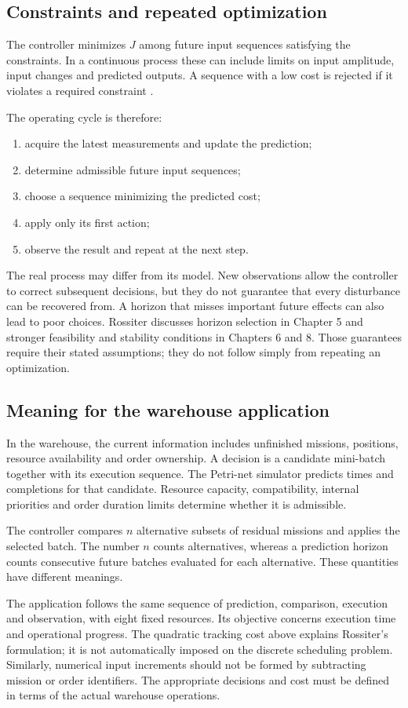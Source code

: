 \subsection{Constraints and repeated optimization}

The controller minimizes $J$ among future input sequences satisfying the constraints. In a continuous process these can include limits on input amplitude, input changes and predicted outputs. A sequence with a low cost is rejected if it violates a required constraint \cite[Section 1.6.8 and Chapter 7]{Rossiter2018}.

The operating cycle is therefore:
\begin{enumerate}
    \item acquire the latest measurements and update the prediction;
    \item determine admissible future input sequences;
    \item choose a sequence minimizing the predicted cost;
    \item apply only its first action;
    \item observe the result and repeat at the next step.
\end{enumerate}

The real process may differ from its model. New observations allow the controller to correct subsequent decisions, but they do not guarantee that every disturbance can be recovered from. A horizon that misses important future effects can also lead to poor choices. Rossiter discusses horizon selection in Chapter 5 and stronger feasibility and stability conditions in Chapters 6 and 8. Those guarantees require their stated assumptions; they do not follow simply from repeating an optimization.

\subsection{Meaning for the warehouse application}

In the warehouse, the current information includes unfinished missions, positions, resource availability and order ownership. A decision is a candidate mini-batch together with its execution sequence. The Petri-net simulator predicts times and completions for that candidate. Resource capacity, compatibility, internal priorities and order duration limits determine whether it is admissible.

The controller compares $n$ alternative subsets of residual missions and applies the selected batch. The number $n$ counts alternatives, whereas a prediction horizon counts consecutive future batches evaluated for each alternative. These quantities have different meanings.

The application follows the same sequence of prediction, comparison, execution and observation, with eight fixed resources. Its objective concerns execution time and operational progress. The quadratic tracking cost above explains Rossiter's formulation; it is not automatically imposed on the discrete scheduling problem. Similarly, numerical input increments should not be formed by subtracting mission or order identifiers. The appropriate decisions and cost must be defined in terms of the actual warehouse operations.

